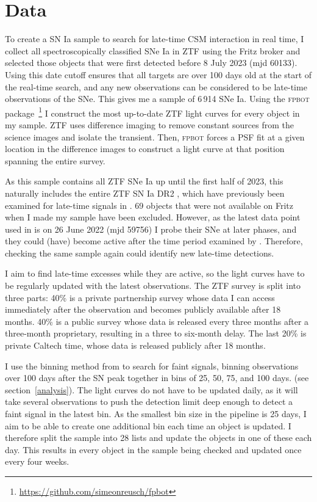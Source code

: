 \documentclass[a4paper,oneside,12pt, class=Latex/Classes/PhDthesisPSnPDF, crop=false]{standalone}
\begin{document}
\section{Data}
\label{data}
To create a SN Ia sample to search for late-time CSM interaction in real time, I collect all spectroscopically classified SNe Ia in ZTF using the Fritz broker \citep{skyportal2019, Skyportal} and selected those objects that were first detected before 8 July 2023 (mjd 60133). Using this date cutoff ensures that all targets are over 100 days old at the start of the real-time search, and any new observations can be considered to be late-time observations of the SNe. This gives me a sample of 6\,914 SNe Ia. Using the \textsc{fpbot} package \citep{fpbot}\,\footnote{\url{https://github.com/simeonreusch/fpbot}} I construct the most up-to-date ZTF light curves for every object in my sample. ZTF uses difference imaging to remove constant sources from the science images and isolate the transient. Then, \textsc{fpbot} forces a PSF fit at a given location in the difference images to construct a light curve at that position spanning the entire survey.

As this sample contains all ZTF SNe Ia up until the first half of 2023, this naturally includes the entire ZTF SN Ia DR2 \citep[][Smith et al., in prep.]{DR2_Overview}, which have previously been examined for late-time signals in \citet{Terwel_2024_paper1}. 69 objects that were not available on Fritz when I made my sample have been excluded. However, as the latest data point used in \citet{Terwel_2024_paper1} is on 26 June 2022 (mjd 59756) I probe their SNe at later phases, and they could (have) become active after the time period examined by \citet{Terwel_2024_paper1}. Therefore, checking the same sample again could identify new late-time detections.

I aim to find late-time excesses while they are active, so the light curves have to be regularly updated with the latest observations. The ZTF survey is split into three parts: 40\% is a private partnership survey whose data I can access immediately after the observation and becomes publicly available after 18 months. 40\% is a public survey whose data is released every three months after a three-month proprietary, resulting in a three to six-month delay. The last 20\% is private Caltech time, whose data is released publicly after 18 months.

I use the binning method from \citet{Terwel_2024_paper1} to search for faint signals, binning observations over 100 days after the SN peak together in bins of 25, 50, 75, and 100 days. (see section~\ref{analysis}). The light curves do not have to be updated daily, as it will take several observations to push the detection limit deep enough to detect a faint signal in the latest bin. As the smallest bin size in the pipeline is 25 days, I aim to be able to create one additional bin each time an object is updated. I therefore split the sample into 28 lists and update the objects in one of these each day. This results in every object in the sample being checked and updated once every four weeks.
\end{document}
